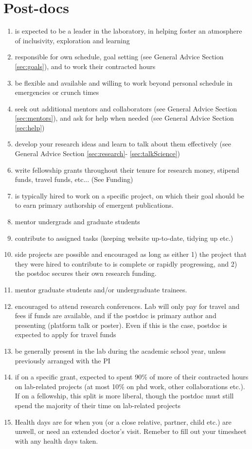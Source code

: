 \documentclass[12pt]{article}
\begin{document}
\section{Post-docs}
\begin{enumerate}
\item is expected to be a leader in the laboratory, in helping foster
  an atmosphere of inclusivity, exploration and learning
\item  responsible for own schedule, goal setting (see General
  Advice Section \ref{sec:goals}), and to work their contracted hours
\item be flexible and available and willing to work beyond personal
  schedule in emergencies or crunch times
\item seek out additional mentors and collaborators (see General
  Advice Section \ref{sec:mentors}), and ask for help when needed (see
  General Advice Section \ref{sec:help})
\item develop your research ideas and learn to talk about them
  effectively (see General Advice Section \ref{sec:research}-
  \ref{sec:talkScience})
\item  write fellowship grants throughout their tenure
  for research money, stipend funds, travel funds, etc... (See Funding)
\item is typically hired to work on a specific project, on which
  their goal should be to earn primary authorship of emergent
  publications.
\item mentor undergrads and graduate students
\item contribute to assigned tasks (keeping website up-to-date,
  tidying up etc.)
\item side projects are possible and encouraged as long as either 1)
  the project that they were hired to contribute to is complete or
  rapidly progressing, and 2) the postdoc secures their own research
  funding.
\item mentor graduate students and/or undergraduate trainees.
\item encouraged to attend research conferences. Lab will only pay
  for travel and fees if funds are available, and if the postdoc is
  primary author and presenting (platform talk or poster). Even if
  this is the case, postdoc is expected to apply for travel funds
\item be generally present in the lab during the academic school year,
  unless previously arranged with the PI
\item if on a specific grant, expected to spent 90\% of more of
  their contracted hours on lab-related projects (at most 10\%
  on phd work, other collaborations etc.). If on a fellowship,
  this split is more liberal, though the postdoc must still
  spend the majority of their time on lab-related projects
\item Health days are for when you (or a close relative, partner,
  child etc.) are unwell, or need an extended doctor's visit. Remeber
  to fill out your timesheet with any health days taken.
\end{enumerate}
\end{document}
